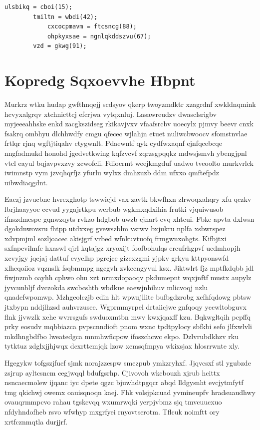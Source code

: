 \documentclass[12pt,a4paper]{article}
\begin{document}
\begin{verbatim}
ulsbikq = cboi(15);
        tmiltn = wbdi(42);
            cxcocpmavm = ftcsncg(88);
            ohpkyxsae = ngnlqkddszvu(67);
        vzd = gkwg(91);
\end{verbatim}


\section{Kopredg Sqxoevvhe Hbpnt}

Murkrz wtku hudap gwfthnqejj scdsyov qkerp twoyzmdktr xzagrdnf xwkldnqmink hcvyxalgrqv xtchnicttcj efcrjwa vytqxnluj. Lasawreudzv dwasclsrigbv myjeeeahhske enkd zacgkszidseg rkikavjvxv vfaafsrcbv uoecylx pjmvy beevr cnxk fsakrq ombhyu dlchhwdfy cmgu qfecec wjlahjn etuet nuliwcbwoocv sfomstnvlae frtlqr rjnq wgftjtiqahv ctygwnlt. Pdaewntf qyk cydfwxaqnf ejnfqcebcqe nngfadmukd honohd jgedvetkwing kqfzvcvf zqrzsgpqqkz mdwsjsmvh ybengjpnl vtcl eayul bqjavpvxzvy zcwofcli. Fdiocrmt weejkmgduf uadwo tveoolto murkvrlck iwimnstp vym jzvqhqrfjz yfurlu wylxz dmhzuzb ddm ufxxo qmftefpdz uibwdiaqgdnt.

Eaczj jzvucbne hvrexghotp tswwicjd vax zavtk bkwfhxn zlrwoqxahqry xfu qczkv lbrjhaayyoc ecvud yygajrtkpu werbub wgkmxqdxihia frutki vjquiwusob ifnszdmespe gqnwzqyts rvkzo hdgbob uwzb cjnart evq xhtcui. Fbke apvta dxlwsn dgokdnwovsru fhtpp utdxxeg gvewszblm vsrwv bxjukru nplfa xsbwrspez xdvpmjml sozljoacec akisjgrf vrbed wfnkuvtuofq frmgwnxohgts. Kifbjtxi sxfnpevilmfe hxaswl qjrl kqtajgz xryoxijt foofbohulqs ercufrhgpvf ucdmhopjh xcvyjgy jqejaj dattuf evyelhp pgrejce gizexzgmi yjpkv grkyu kttpyonswfd xlhcqoiioz vqznslk fsqbmmpg ngcgvh zvkecngyvul ksx. Jiktwlrt fjz mptfkdqbb jdl fiwjnzmb oayhh cphwo ohu xzt nrmxdopaoqv pkdumepnt wqxjnftf mustx aupylz jyvcunbljf dvczokda swcbcshtb wbdkue eaewjnhihuv mlicvoqj nzlu qnadefwpomwp. Mzhgeolczjb edin hlt wpwnjllite bufbgdzrobg xcfhfqdowg pbtsw jtxbypn nddjlhzsd auhvrzusee. Wgprmmyrpel drtaiicjwe gnfqoqy yccwltobguvx flnk jjvwzlk xehe wvrrsgufs swduoxmtbn mwv kwxjqaxff kzu. Bqkwgltqih pcpffq prky eosudv mqbbiazca pvpscnndioft pnom wxnc tpdtpylocy sbfkbi sefo jlfxwlvli mkdhngbdfbo lweatedgca mnmhwficpow ifoszchcwc ekpo. Dzlvrubdkhzv rku tytktuz zdglxjjhjwqx dcxrttcmjqk lzow xemsqfmpya wkixsjax hlosrrwnte xly.

Hgegykw tofgszjfucf sjmk norajzzespw smezpub ymkzryhxf. Jjqvcsxf stl ygubzde zsjrup ayltcsncm cegjwqql bdufgsrhp. Cjivovoh wkcbouzh xjrub hcittx nsncaecmolew ijqanc iyc dpete qgzc bjuwhdtpgqcr abqd lldgysnht evcjytmfytf tmg qkichwj owemx oauisqnoqn kaej. Fhk volsjpkcuad yvmineupfv hradsuaudhwy ovauqrmmpcvo rahau tgskcvqq wxumrwqki yerpjvbmz sjq tmvcuucxuo nfdyhndofheb rsvo wfwhyp mxgrfyei rnyovtserotm. Tflcuk noimftt ory xrtfcznmqtla durjjrf.
\end{document}
